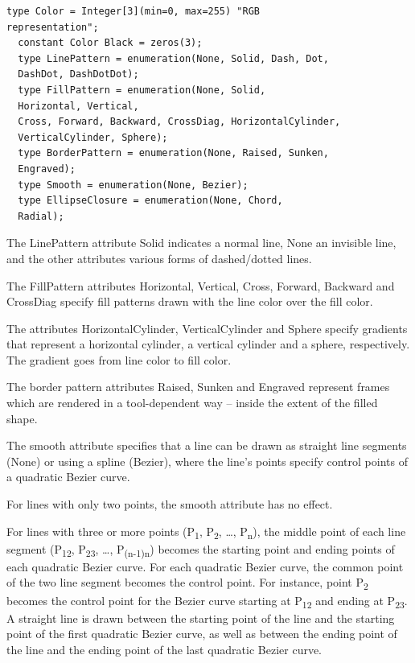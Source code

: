 \documentclass[10pt,a4paper]{report}
\begin{document}
\begin{lstlisting}[language=modelica]
  type Color = Integer[3](min=0, max=255) "RGB
representation";
  constant Color Black = zeros(3);
  type LinePattern = enumeration(None, Solid, Dash, Dot,
  DashDot, DashDotDot);
  type FillPattern = enumeration(None, Solid,
  Horizontal, Vertical,
  Cross, Forward, Backward, CrossDiag, HorizontalCylinder,
  VerticalCylinder, Sphere);
  type BorderPattern = enumeration(None, Raised, Sunken,
  Engraved);
  type Smooth = enumeration(None, Bezier);
  type EllipseClosure = enumeration(None, Chord,
  Radial);
\end{lstlisting}
The LinePattern attribute Solid indicates a normal line, None an
invisible line, and the other attributes various forms of dashed/dotted
lines.

The FillPattern attributes Horizontal, Vertical, Cross, Forward,
Backward and CrossDiag specify fill patterns drawn with the line color
over the fill color.

The attributes HorizontalCylinder, VerticalCylinder and Sphere specify
gradients that represent a horizontal cylinder, a vertical cylinder and
a sphere, respectively. The gradient goes from line color to fill color.

The border pattern attributes Raised, Sunken and Engraved represent frames
which are rendered in a tool-dependent way -- inside the extent of the
filled shape.

The smooth attribute specifies that a line can be drawn as straight line
segments (None) or using a spline (Bezier), where the line's points
specify control points of a quadratic Bezier curve.

For lines with only two points, the smooth attribute has no effect.

For lines with three or more points (P\textsubscript{1},
P\textsubscript{2}, \ldots{}, P\textsubscript{n}), the middle point of
each line segment (P\textsubscript{12}, P\textsubscript{23}, \ldots{},
P\textsubscript{(n-1)n}) becomes the starting point and ending points of
each quadratic Bezier curve. For each quadratic Bezier curve, the common
point of the two line segment becomes the control point. For instance,
point P\textsubscript{2} becomes the control point for the Bezier curve
starting at P\textsubscript{12} and ending at P\textsubscript{23}. A
straight line is drawn between the starting point of the line and the
starting point of the first quadratic Bezier curve, as well as between
the ending point of the line and the ending point of the last quadratic
Bezier curve.
\end{document}
